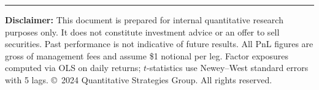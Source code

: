 \documentclass[10pt]{article}
\begin{document}
\vspace{8pt}
{\color{lightrule}\rule{\linewidth}{0.4pt}}
\vspace{4pt}
{\tiny\color{midgray}
\textbf{Disclaimer:} This document is prepared for internal quantitative research purposes only.
It does not constitute investment advice or an offer to sell securities. Past performance is not
indicative of future results. All PnL figures are gross of management fees and assume \$1 notional
per leg. Factor exposures computed via OLS on daily returns; $t$-statistics use Newey--West
standard errors with 5 lags. \copyright\ 2024 Quantitative Strategies Group. All rights reserved.}
\end{document}
